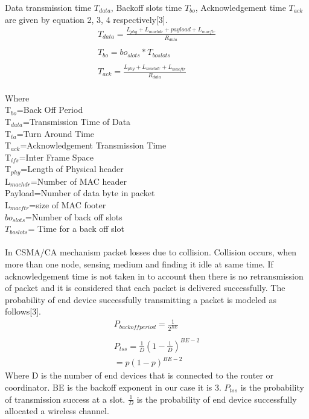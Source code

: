 \documentclass[11pt, conference, compsocconf, onecolumn]{IEEEtran}
\begin{document}
Data transmission time $T_{data}$, Backoff slots time $T_{bo}$, Acknowledgement time $T_{ack}$ are given by equation 2, 3, 4 respectively[3].
\\
\begin{eqnarray}
T_{data}=\frac{L_{phy} + L_{mac hdr} + payload + L_{mac ftr}}{R_{data}}\\
\nonumber\\
T_{bo}=bo_{slots} * T_{boslots}      \\
\nonumber\\
T_{ack}= \frac{L_{phy} + L_{mac hdr} + L_{mac ftr}}{R_{data}}
\end{eqnarray}
\\
Where
\\
T$_{bo}$=Back Off Period
\\
T$_{data}$=Transmission Time of Data
\\
T$_{ta}$=Turn Around Time
\\
T$_{ack}$=Acknowledgement Transmission Time
\\
T$_{ifs}$=Inter Frame Space
\\
T$_{phy}$=Length of Physical header
\\
L$_{mac hdr}$=Number of MAC header
\\
Payload=Number of data byte in packet
\\
L$_{mac ftr}$=size of MAC footer
\\
$bo_{slots}$=Number of back off slots
\\
$T_{bo slots}$= Time for a back off slot
\\\\
\indent In CSMA/CA mechanism packet losses due to collision. Collision occurs, when more than one node, sensing medium and finding it idle at same time. If acknowledgement time is not taken in to account then there is no retransmission of packet and it is considered that each packet is delivered successfully.
The probability of end device successfully transmitting a packet is modeled as follows[3].
\\
\begin{eqnarray}
P_{backoff period}=\frac{1}{2^{BE}}
\\
\nonumber\\
P_{tss}= \frac{1}{D}{(1-\frac{1}{D})}^{BE-2} \\
= p({1-p})^{BE-2} \nonumber
\end{eqnarray}
\indent Where D is the number of end devices that is connected to the router or coordinator. BE is the backoff exponent in our case it is 3. $P_{tss}$ is the probability of transmission success at a slot. $\frac{1}{D}$ is the probability of end device successfully allocated a wireless channel.\\
\end{document}
